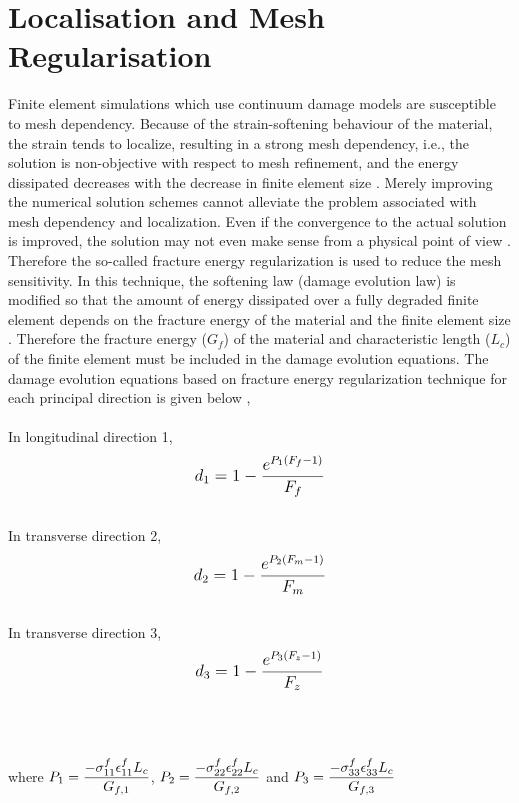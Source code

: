 \documentclass[12pt,a4paper,twoside,openright]{report}
\begin{document}
\section{Localisation and Mesh Regularisation}\label{Mesh Regularisation}
\indent\indent\indent Finite element simulations which use continuum damage models are susceptible to mesh dependency.  Because of the strain-softening behaviour of the material, the strain tends to localize, resulting in a strong mesh dependency, i.e., the solution is non-objective with respect to mesh refinement, and the energy dissipated decreases with the decrease in finite element size \citep{lapczyk2007progressive}. Merely improving the numerical solution schemes cannot alleviate the problem associated with mesh dependency and localization. Even if the convergence to the actual solution is improved, the solution may not even make sense from a physical point of view \citep{peerlings1999enhanced}. Therefore the so-called fracture energy regularization is used to reduce the mesh sensitivity. In this technique, the softening law (damage evolution law) is modified so that the amount of energy dissipated over a fully degraded finite element depends on the fracture energy of the material and the finite element size \citep{cervera2006smeared}. Therefore the fracture energy ($G_f$) of the material and characteristic length ($L_{c}$) of the finite element must be included in the damage evolution equations. The damage evolution equations based on fracture energy regularization technique for each principal direction is given below \citep{wang2009three}, \\
\\
In longitudinal direction 1,
\begin{equation}
\label{d1}
\mathlarger{d_{1} = 1 - \frac{e^{P_{1}(F_{f} - 1)}}{F_{f}}}
\end{equation}
\\
In transverse direction 2,
\begin{equation}
\label{d2}  
\mathlarger{d_{2} = 1 - \frac{e^{P_{2}(F_{m} - 1)}}{F_{m}}}
\end{equation}
\\
In transverse direction 3,
\begin{equation}
\label{d3} 
\mathlarger{d_{3} = 1 - \frac{e^{P_{3}(F_{z} - 1)}}{F_{z}}}
\end{equation}
\\
\\
\\
where $\mathlarger{P_{1} = \frac{-\sigma_{11}^{f}\epsilon_{11}^{f}L_{c}}{G_{f,1}}}$, $\mathlarger{P_{2} = \frac{-\sigma_{22}^{f}\epsilon_{22}^{f}L_{c}}{G_{f,2}}}$ and $\mathlarger{P_{3} = \frac{-\sigma_{33}^{f}\epsilon_{33}^{f}L_{c}}{G_{f,3}}}$ 
\end{document}
